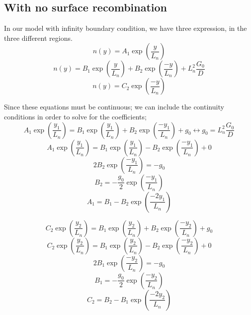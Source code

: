 \subsection{With no surface recombination}

In our model with infinity boundary condition, we have three expression, in the three different regions.
\begin{equation}\label{eqtn12}
n(y) = A_1\exp \left(\frac{y}{L_n}\right)
\end{equation}
\begin{equation} \label{eqtn13}
n(y) = B_1\exp \left(\frac{y}{L_n}\right) + B_2\exp \left(\frac{-y}{L_n}\right) +   L_n^2\frac{G_0}{D} 
\end{equation}
\begin{equation} \label{eqtn14}
n(y) = C_2\exp \left(\frac{-y}{L_n}\right)
\end{equation}

Since these equations must be continuous; we can include the continuity conditions in order to solve for the coefficients;
\begin{equation} \label{eqtn15}
 A_1\exp \left(\frac{y_1}{L_n}\right) =  B_1\exp \left(\frac{y_1}{L_n}\right) + B_2\exp \left(\frac{-y_1}{L_n}\right) + g_0 \longleftrightarrow g_0 =  L_n^2\frac{G_0}{D} 
\end{equation}
\begin{equation} \label{eqtn16}
 A_1\exp \left(\frac{y_1}{L_n}\right) =  B_1\exp \left(\frac{y_1}{L_n}\right) - B_2\exp \left(\frac{-y_1}{L_n}\right) + 0
\end{equation}
\begin{equation*}
 2B_2\exp \left(\frac{-y_1}{L_n}\right) = -g_0 
 \end{equation*}
\begin{equation}
 \label{eqtn17}
 B_2 = -\frac{g_0}{2}\exp \left(\frac{-y_1}{L_n}\right) 
\end{equation}
\begin{equation}
\label{eqtn:eq02r}
A_1 = B_1 -B_2\exp \left(\frac{-2y_1}{L_n}\right)
\end{equation}

\begin{equation} \label{eqtn18}
 C_2\exp \left(\frac{y_2}{L_n}\right) =  B_1\exp \left(\frac{y_2}{L_n}\right) + B_2\exp \left(\frac{-y_2}{L_n}\right) + g_0
\end{equation}
\begin{equation} \label{eqtn19}
 C_2\exp \left(\frac{y_2}{L_n}\right) =  B_1\exp \left(\frac{y_2}{L_n}\right) - B_2\exp \left(\frac{-y_2}{L_n}\right) + 0
\end{equation}
\begin{equation*}
 2B_1\exp \left(\frac{-y_2}{L_n}\right) = -g_0 
\end{equation*} 
\begin{equation}
 \label{eqtn20}
B_1 = -\frac{g_0}{2}\exp \left(\frac{-y_2}{L_n}\right) 
\end{equation}
\begin{equation}
\label{eqn:eq03r}
 C_2 = B_2 -B_1\exp \left(\frac{-2y_2}{L_n}\right)
\end{equation}

